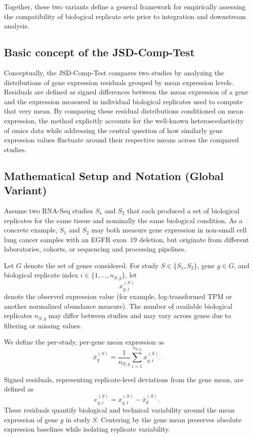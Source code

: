 Together, these two variants define a general framework for empirically assessing the compatibility of biological replicate sets prior to integration and downstream analysis.

\subsection{Basic concept of the JSD-Comp-Test}

Conceptually, the JSD-Comp-Test compares two studies by analyzing the distributions of gene expression residuals grouped by mean expression levels. Residuals are defined as signed differences between the mean expression of a gene and the expression measured in individual biological replicates used to compute that very mean. By comparing these residual distributions conditioned on mean expression, the method explicitly accounts for the well-known heteroscedasticity of omics data while addressing the central question of how similarly gene expression values fluctuate around their respective means across the compared studies.

\subsection{Mathematical Setup and Notation (Global Variant)}

Assume two RNA-Seq studies $S_1$ and $S_2$ that each produced a set of biological replicates for the same tissue and nominally the same biological condition. As a concrete example, $S_1$ and $S_2$ may both measure gene expression in non-small cell lung cancer samples with an EGFR exon~19 deletion, but originate from different laboratories, cohorts, or sequencing and processing pipelines.

Let $G$ denote the set of genes considered. For study $S \in \{S_1,S_2\}$, gene $g \in G$, and biological replicate index $i \in \{1,\ldots,n_{S,g}\}$, let
\[
x^{(S)}_{g,i}
\]
denote the observed expression value (for example, log-transformed TPM or another normalized abundance measure). The number of available biological replicates $n_{S,g}$ may differ between studies and may vary across genes due to filtering or missing values.

We define the per-study, per-gene mean expression as
\[
\bar{x}^{(S)}_{g} = \frac{1}{n_{S,g}} \sum_{i=1}^{n_{S,g}} x^{(S)}_{g,i}.
\]

Signed residuals, representing replicate-level deviations from the gene mean, are defined as
\[
e^{(S)}_{g,i} = x^{(S)}_{g,i} - \bar{x}^{(S)}_{g}.
\]
These residuals quantify biological and technical variability around the mean expression of gene $g$ in study $S$. Centering by the gene mean preserves absolute expression baselines while isolating replicate variability.

